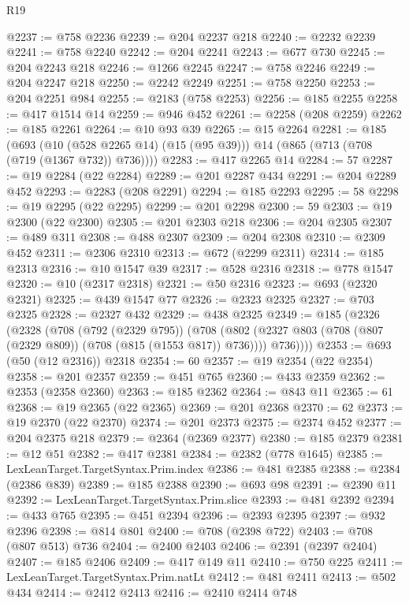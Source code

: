 \begin{lexlean}{R19}
\begin{coremodule}
{{{{{@2237 := @758 @2236
@2239 := @204 @2237 @218
@2240 := @2232 @2239
@2241 := @758 @2240
@2242 := @204 @2241
@2243 := @677 @730
@2245 := @204 @2243 @218
@2246 := @1266 @2245
@2247 := @758 @2246
@2249 := @204 @2247 @218
@2250 := @2242 @2249
@2251 := @758 @2250
@2253 := @204 @2251 @984
@2255 := @2183 (@758 @2253)
@2256 := @185 @2255
@2258 := @417 @1514 @14
@2259 := @946 @452
@2261 := @2258 (@208 @2259)
@2262 := @185 @2261
@2264 := @10 @93 @39
@2265 := @15 @2264
@2281 := @185
    (@693 (@10 (@528 @2265 @14) (@15 (@95 @39))) @14 (@865 (@713 (@708 (@719 (@1367 @732)) @736))))
@2283 := @417 @2265 @14
@2284 := 57
@2287 := @19 @2284 (@22 @2284)
@2289 := @201 @2287 @434
@2291 := @204 @2289 @452
@2293 := @2283 (@208 @2291)
@2294 := @185 @2293
@2295 := 58
@2298 := @19 @2295 (@22 @2295)
@2299 := @201 @2298
@2300 := 59
@2303 := @19 @2300 (@22 @2300)
@2305 := @201 @2303 @218
@2306 := @204 @2305
@2307 := @489 @311
@2308 := @488 @2307
@2309 := @204 @2308
@2310 := @2309 @452
@2311 := @2306 @2310
@2313 := @672 (@2299 @2311)
@2314 := @185 @2313
@2316 := @10 @1547 @39
@2317 := @528 @2316
@2318 := @778 @1547
@2320 := @10 (@2317 @2318)
@2321 := @50 @2316
@2323 := @693 (@2320 @2321)
@2325 := @439 @1547 @77
@2326 := @2323 @2325
@2327 := @703 @2325
@2328 := @2327 @432
@2329 := @438 @2325
@2349 := @185
    (@2326
      (@2328
        (@708
          (@792 (@2329 @795))
          (@708
            (@802 (@2327 @803 (@708 (@807 (@2329 @809)) (@708 (@815 (@1553 @817)) @736))))
            @736))))
@2353 := @693 (@50 (@12 @2316)) @2318
@2354 := 60
@2357 := @19 @2354 (@22 @2354)
@2358 := @201 @2357
@2359 := @451 @765
@2360 := @433 @2359
@2362 := @2353 (@2358 @2360)
@2363 := @185 @2362
@2364 := @843 @11
@2365 := 61
@2368 := @19 @2365 (@22 @2365)
@2369 := @201 @2368
@2370 := 62
@2373 := @19 @2370 (@22 @2370)
@2374 := @201 @2373
@2375 := @2374 @452
@2377 := @204 @2375 @218
@2379 := @2364 (@2369 @2377)
@2380 := @185 @2379
@2381 := @12 @51
@2382 := @417 @2381
@2384 := @2382 (@778 @1645)
@2385 := LexLeanTarget.TargetSyntax.Prim.index
@2386 := @481 @2385
@2388 := @2384 (@2386 @839)
@2389 := @185 @2388
@2390 := @693 @98
@2391 := @2390 @11
@2392 := LexLeanTarget.TargetSyntax.Prim.slice
@2393 := @481 @2392
@2394 := @433 @765
@2395 := @451 @2394
@2396 := @2393 @2395
@2397 := @932 @2396
@2398 := @814 @801
@2400 := @708 (@2398 @722)
@2403 := @708 (@807 @513) @736
@2404 := @2400 @2403
@2406 := @2391 (@2397 @2404)
@2407 := @185 @2406
@2409 := @417 @149 @11
@2410 := @750 @225
@2411 := LexLeanTarget.TargetSyntax.Prim.natLt
@2412 := @481 @2411
@2413 := @502 @434
@2414 := @2412 @2413
@2416 := @2410 @2414 @748
}}}}}
\end{coremodule}
\end{lexlean}
